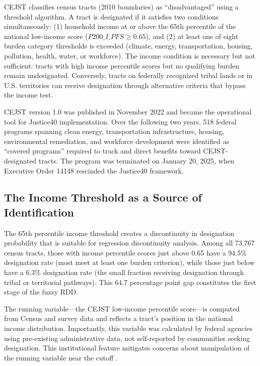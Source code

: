 \documentclass[12pt]{article}
\begin{document}
CEJST classifies census tracts (2010 boundaries) as ``disadvantaged'' using a threshold algorithm. A tract is designated if it satisfies two conditions simultaneously: (1) household income at or above the 65th percentile of the national low-income score ($P200\_I\_PFS \geq 0.65$), and (2) at least one of eight burden category thresholds is exceeded (climate, energy, transportation, housing, pollution, health, water, or workforce). The income condition is necessary but not sufficient: tracts with high income percentile scores but no qualifying burden remain undesignated. Conversely, tracts on federally recognized tribal lands or in U.S. territories can receive designation through alternative criteria that bypass the income test.

CEJST version 1.0 was published in November 2022 and became the operational tool for Justice40 implementation. Over the following two years, 518 federal programs spanning clean energy, transportation infrastructure, housing, environmental remediation, and workforce development were identified as ``covered programs'' required to track and direct benefits toward CEJST-designated tracts. The program was terminated on January 20, 2025, when Executive Order 14148 rescinded the Justice40 framework.

\subsection{The Income Threshold as a Source of Identification}

The 65th percentile income threshold creates a discontinuity in designation probability that is suitable for regression discontinuity analysis. Among all 73,767 census tracts, those with income percentile scores just above 0.65 have a 94.5\% designation rate (most meet at least one burden criterion), while those just below have a 6.3\% designation rate (the small fraction receiving designation through tribal or territorial pathways). This 64.7 percentage point gap constitutes the first stage of the fuzzy RDD.

The running variable---the CEJST low-income percentile score---is computed from Census and survey data and reflects a tract's position in the national income distribution. Importantly, this variable was calculated by federal agencies using pre-existing administrative data, not self-reported by communities seeking designation. This institutional feature mitigates concerns about manipulation of the running variable near the cutoff \citep{mccrary2008manipulation, lee2010regression}.
\end{document}
